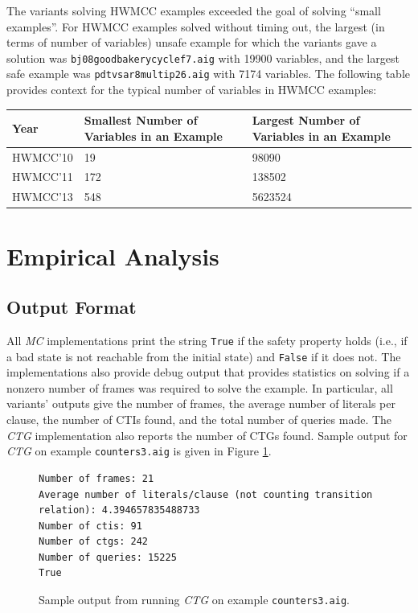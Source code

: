 \documentclass[12pt,a4paper,twoside,openright]{report}
\begin{document}
{{The variants solving HWMCC examples exceeded the goal of solving ``small examples''.
For HWMCC examples solved without timing out,
the largest (in terms of number of variables) unsafe example for which the variants gave a
solution was \verb,bj08goodbakerycyclef7.aig, with 19900 variables,
and the largest safe example 
was \verb,pdtvsar8multip26.aig, with 7174 variables.
The following table provides context for the typical number of variables in HWMCC
examples:
\begin{center}
\begin{tabular}{|l | p{15em} | p{15em}|}
\hline
Year & Smallest Number of Variables in an Example & Largest Number of Variables in an
Example \\
\hline
HWMCC'10 & 19 & 98090\\
HWMCC'11 & 172 & 138502\\
HWMCC'13 & 548 & 5623524\\
\hline
\end{tabular}
\end{center}

\section{Empirical Analysis}
\label{eval:analysis}

\subsection{Output Format}
\label{eval:output}

All \emph{MC} implementations print the string \verb,True, if the safety
property holds (i.e., if a bad state is not reachable from the initial state) and
\verb,False, if it does not. The implementations also provide debug output that provides
statistics on solving if a nonzero number of frames was required to solve the example.
In particular, all variants' outputs give the number of frames, the average number of
literals per clause, the number of CTIs found, and the total number of queries made. The {\it CTG} implementation also reports the number of CTGs found. Sample output
for {\it CTG} on example \verb,counters3.aig,
is given in Figure \ref{sampleoutput}.

\begin{figure}[t]
\centering
\begin{lstlisting}[keywordstyle = \ttfamily, basicstyle = \footnotesize\ttfamily]
Number of frames: 21
Average number of literals/clause (not counting transition relation): 4.394657835488733
Number of ctis: 91
Number of ctgs: 242
Number of queries: 15225
True
\end{lstlisting}
\caption{Sample output from running \emph{CTG} on example {\tt counters3.aig}.}
\label{sampleoutput}
\end{figure}

}}
\end{document}
